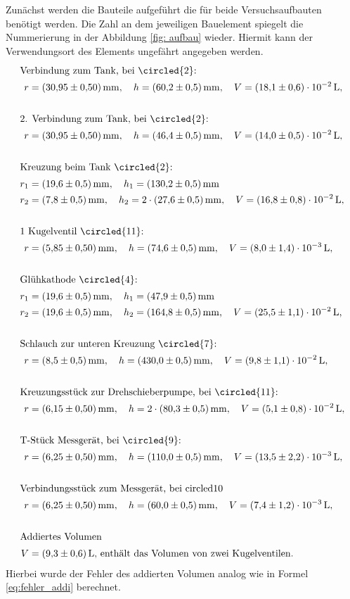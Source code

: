 Zunächst werden die Bauteile aufgeführt die für beide Versuchsaufbauten benötigt werden.
Die Zahl an dem jeweiligen Bauelement spiegelt die Nummerierung in der Abbildung \ref{fig: aufbau} wieder.
Hiermit kann der Verwendungsort des Elements ungefährt angegeben werden.
\begin{align*}
  \shortintertext{Verbindung zum Tank, bei \circled{2}:}
  r&=\SI{30.95\pm 0.5}{\milli\meter}, \quad h=\SI{60.2\pm0.5}{\milli\meter}, \quad V=\SI{ 18.1\pm0.6 e-2}{\litre},\\
  \\
  \shortintertext{2. Verbindung zum Tank, bei  \circled{2}:}
  r&=\SI{30.95\pm 0.5}{\milli\meter}, \quad h=\SI{46.4\pm0.5}{\milli\meter}, \quad V=\SI{ 14.0\pm0.5 e-2}{\litre},\\
  \\
  \shortintertext{Kreuzung beim Tank \circled{2}:}
  r_1&=\SI{19.6\pm 0.5}{\milli\meter}, \quad h_1=\SI{130.2\pm0.5}{\milli\meter}\\
  r_2&=\SI{7.8\pm 0.5}{\milli\meter}, \quad h_2=2\cdot  \SI{27.6\pm0.5}{\milli\meter}, \quad V=\SI{ 16.8\pm0.8 e-2}{\litre},\\
  \\
  \shortintertext{1 Kugelventil \circled{11}:}
  r&=\SI{5.85\pm 0.5}{\milli\meter}, \quad h=\SI{74.6\pm0.5}{\milli\meter}, \quad V=\SI{ 8.0\pm1.4 e-3}{\litre},\\
  \\
  \shortintertext{Glühkathode \circled{4}:}
  r_1&=\SI{19.6\pm 0.5}{\milli\meter}, \quad h_1=\SI{47.9\pm0.5}{\milli\meter}\\
  r_2&=\SI{19.6\pm 0.5}{\milli\meter}, \quad h_2=\SI{164.8\pm0.5}{\milli\meter}, \quad V=\SI{ 25.5\pm1.1 e-2}{\litre},\\
  \\
  \shortintertext{Schlauch zur unteren Kreuzung \circled{7}: }
  r&=\SI{8.5\pm 0.5}{\milli\meter}, \quad h=\SI{430\pm0.5}{\milli\meter}, \quad V=\SI{ 9.8\pm1.1 e-2}{\litre},\\
  \\
  \shortintertext{Kreuzungsstück zur Drehschieberpumpe, bei \circled{11}:}
  r&=\SI{6.15\pm 0.5}{\milli\meter}, \quad h=2\cdot\SI{80.3\pm0.5}{\milli\meter}, \quad V=\SI{ 5.1\pm0.8 e-2}{\litre},\\
  \\
  \shortintertext{T-Stück Messgerät, bei \circled{9}: }
  r&=\SI{6.25\pm 0.5}{\milli\meter}, \quad h=\SI{110\pm0.5}{\milli\meter}, \quad V=\SI{ 13.5\pm2.2 e-3}{\litre},\\
  \\
  \shortintertext{Verbindungsstück zum Messgerät, bei  circled{10}}
  r&=\SI{6.25\pm 0.5}{\milli\meter}, \quad h=\SI{60\pm0.5}{\milli\meter}, \quad V=\SI{ 7.4\pm1.2 e-3}{\litre},\\
  \\
  \shortintertext{Addiertes Volumen}
  V&=\SI{ 9.3\pm0.6}{\litre},\,  \text{enthält das Volumen von zwei Kugelventilen}.
\end{align*}
Hierbei wurde der Fehler des addierten Volumen analog wie in Formel \ref{eq:fehler_addi} berechnet.

